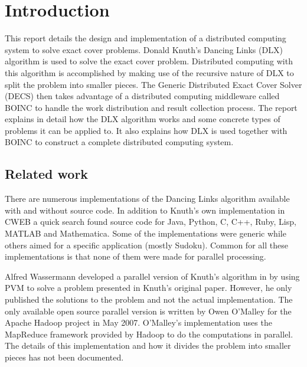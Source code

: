 
\chapter{Introduction}

This report details the design and implementation of a distributed computing system to solve exact cover problems.
Donald Knuth's Dancing Links (DLX) algorithm \cite{knuth00dancing} is used to solve the exact cover problem.
Distributed computing with this algorithm is accomplished by making use of the recursive nature of DLX to split the problem into smaller pieces.
The Generic Distributed Exact Cover Solver (DECS) then takes advantage of a distributed computing middleware called BOINC \cite{boinc} to handle the work distribution and result collection process.
The report explains in detail how the DLX algorithm works and some concrete types of problems it can be applied to.
It also explains how DLX is used together with BOINC to construct a complete distributed computing system.


\section{Related work}

There are numerous implementations of the Dancing Links algorithm available with and without source code.
In addition to Knuth's own implementation in CWEB \cite{cweb} a quick search found source code for Java, Python, C, C++, Ruby, Lisp, MATLAB and Mathematica.
Some of the implementations were generic while others aimed for a specific application (mostly Sudoku).
Common for all these implementations is that none of them were made for parallel processing.

Alfred Wassermann developed a parallel version of Knuth's algorithm in \cite{wassermann99covering} by using PVM \cite{pvm} to solve a problem presented in Knuth's original paper.
However, he only published the solutions to the problem and not the actual implementation.
The only available open source parallel version is written by Owen O'Malley for the Apache Hadoop project \cite{hadoop} in May 2007.
O'Malley's implementation uses the MapReduce framework \cite{map-reduce} provided by Hadoop to do the computations in parallel.
The details of this implementation and how it divides the problem into smaller pieces has not been documented.




